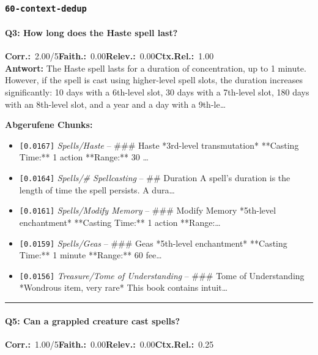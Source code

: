 \subsubsection*{\texttt{60-context-dedup}}
\label{app:samples:60_context_dedup}

\paragraph{Q3: How long does the Haste spell last?}
\noindent \textbf{Corr.:}~2.00/5\quad \textbf{Faith.:}~0.00\quad \textbf{Relev.:}~0.00\quad \textbf{Ctx.Rel.:}~1.00\\

\noindent\textbf{Antwort:} The Haste spell lasts for a duration of concentration, up to 1 minute. However, if the spell is cast using higher-level spell slots, the duration increases significantly: 10 days with a 6th-level slot, 30 days with a 7th-level slot, 180 days with an 8th-level slot, and a year and a day with a 9th-le\ldots

\noindent\textbf{Abgerufene Chunks:}
\begin{itemize}[noitemsep, topsep=2pt]
  \item[\textbf{\#1}] \texttt{[0.0167]} \textit{Spells/Haste} -- \#\#\# Haste  *3rd-level transmutation*  **Casting Time:** 1 action  **Range:** 30 \ldots
  \item[\textbf{\#2}] \texttt{[0.0164]} \textit{Spells/# Spellcasting} -- \#\# Duration  A spell's duration is the length of time the spell persists. A dura\ldots
  \item[\textbf{\#3}] \texttt{[0.0161]} \textit{Spells/Modify Memory} -- \#\#\# Modify Memory  *5th-level enchantment*  **Casting Time:** 1 action  **Range:\ldots
  \item[\textbf{\#4}] \texttt{[0.0159]} \textit{Spells/Geas} -- \#\#\# Geas  *5th-level enchantment*  **Casting Time:** 1 minute  **Range:** 60 fee\ldots
  \item[\textbf{\#5}] \texttt{[0.0156]} \textit{Treasure/Tome of Understanding} -- \#\#\# Tome of Understanding  *Wondrous item, very rare*  This book contains intuit\ldots
\end{itemize}
\vspace{4pt}
\hrule
\vspace{6pt}

\paragraph{Q5: Can a grappled creature cast spells?}
\noindent \textbf{Corr.:}~1.00/5\quad \textbf{Faith.:}~0.00\quad \textbf{Relev.:}~0.00\quad \textbf{Ctx.Rel.:}~0.25\\

